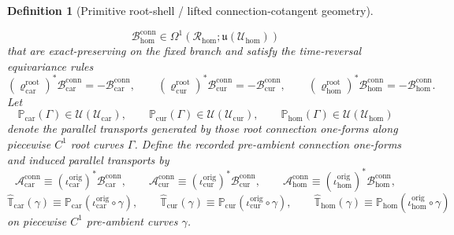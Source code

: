\documentclass[11pt]{article}
\newcommand{\RootTensorClass}{\mathscr U_{\mathrm{car}}}
\newcommand{\RootRelabelClass}{\mathscr U_{\mathrm{cur}}}
\newcommand{\RootFreeClass}{\mathscr U_{\mathrm{hom}}}
\newcommand{\TensorConnectionForm}{\mathcal A_{\mathrm{car}}^{\mathrm{conn}}}
\newcommand{\CurConnectionForm}{\mathcal A_{\mathrm{cur}}^{\mathrm{conn}}}
\newcommand{\HomConnectionForm}{\mathcal A_{\mathrm{hom}}^{\mathrm{conn}}}
\newcommand{\TensorOriginTransport}{\widehat{\mathbb T}_{\mathrm{car}}}
\newcommand{\CurOriginTransport}{\widehat{\mathbb T}_{\mathrm{cur}}}
\newcommand{\HomOriginTransport}{\widehat{\mathbb T}_{\mathrm{hom}}}
\newcommand{\HomRootSpace}{\mathcal R_{\mathrm{hom}}}
\newcommand{\TensorRootTimeRev}{\varrho_{\mathrm{car}}^{\mathrm{root}}}
\newcommand{\CurRootTimeRev}{\varrho_{\mathrm{cur}}^{\mathrm{root}}}
\newcommand{\HomRootTimeRev}{\varrho_{\mathrm{hom}}^{\mathrm{root}}}
\newcommand{\TensorOriginInc}{\iota_{\mathrm{car}}^{\mathrm{orig}}}
\newcommand{\CurOriginInc}{\iota_{\mathrm{cur}}^{\mathrm{orig}}}
\newcommand{\HomOriginInc}{\iota_{\mathrm{hom}}^{\mathrm{orig}}}
\newcommand{\TensorRootConnectionForm}{\mathcal B_{\mathrm{car}}^{\mathrm{conn}}}
\newcommand{\CurRootConnectionForm}{\mathcal B_{\mathrm{cur}}^{\mathrm{conn}}}
\newcommand{\HomRootConnectionForm}{\mathcal B_{\mathrm{hom}}^{\mathrm{conn}}}
\newcommand{\TensorRootTransport}{\mathbb P_{\mathrm{car}}}
\newcommand{\CurRootTransport}{\mathbb P_{\mathrm{cur}}}
\newcommand{\HomRootTransport}{\mathbb P_{\mathrm{hom}}}
\newcommand{\LieU}{\mathfrak u}
\newtheorem{definition}{Definition}
\begin{document}
\begin{definition}[Primitive root-shell / lifted connection-cotangent geometry]
\begin{enumerate}
\[    \HomRootConnectionForm\in\Omega^1(\HomRootSpace;\LieU(\RootFreeClass))
    \]
    that are exact-preserving on the fixed branch and satisfy the time-reversal equivariance rules
    \[
    (\TensorRootTimeRev)^*\TensorRootConnectionForm=-\TensorRootConnectionForm,\qquad
    (\CurRootTimeRev)^*\CurRootConnectionForm=-\CurRootConnectionForm,\qquad
    (\HomRootTimeRev)^*\HomRootConnectionForm=-\HomRootConnectionForm.
    \]
    Let
    \[
    \TensorRootTransport(\Gamma)\in\mathcal U(\RootTensorClass),\qquad
    \CurRootTransport(\Gamma)\in\mathcal U(\RootRelabelClass),\qquad
    \HomRootTransport(\Gamma)\in\mathcal U(\RootFreeClass)
    \]
    denote the parallel transports generated by those root connection one-forms along piecewise \(C^1\) root curves \(\Gamma\). Define the recorded pre-ambient connection one-forms and induced parallel transports by
    \begin{equation}
    \TensorConnectionForm\equiv(\TensorOriginInc)^*\TensorRootConnectionForm,\qquad
    \CurConnectionForm\equiv(\CurOriginInc)^*\CurRootConnectionForm,\qquad
    \HomConnectionForm\equiv(\HomOriginInc)^*\HomRootConnectionForm,
    \label{eq:origin_connection_from_root}
    \end{equation}
    \begin{equation}
    \TensorOriginTransport(\gamma)\equiv\TensorRootTransport(\TensorOriginInc\circ\gamma),\qquad
    \CurOriginTransport(\gamma)\equiv\CurRootTransport(\CurOriginInc\circ\gamma),\qquad
    \HomOriginTransport(\gamma)\equiv\HomRootTransport(\HomOriginInc\circ\gamma)
    \label{eq:origin_transport_from_root}
    \end{equation}
    on piecewise \(C^1\) pre-ambient curves \(\gamma\).
\end{enumerate}


\end{definition}
\end{document}
